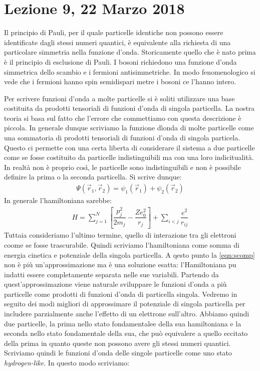 \documentclass[../AppuntiStruttura]{subfiles}
\begin{document}
	\section*{Lezione 9, 22 Marzo 2018}
		Il principio di Pauli, per il quale particelle identiche non possono essere identificate dagli stessi numeri quantici, è equivalente alla richiesta di una particolare simmetria nella funzione d'onda. Storicamente quello che è nato prima è il principio di esclusione di Pauli. I bosoni richiedono una funzione d'onda simmetrica dello scambio e i fermioni antisimmetriche. In modo fenomenologico si vede che i fermioni hanno spin semidispari metre i bosoni ce l'hanno intero.
		
		Per scrivere funzioni d'onda a molte particelle si è soliti utilizzare una base costituita da prodotti tensoriali di funzioni d'onda di singola particella. La nostra teoria si basa sul fatto che l'errore che commettiamo con questa descrizione è piccola. In generale dunque scriviamo la funzione dìonda di molte particelle come una sommatoria di prodotti tensoriali di funzioni d'onda di singola particela. Questo ci permette con una certa liberta di considerare il sistema a due particelle come se fosse costituito da particelle indistinguibili ma con una loro indicitualità. In realtà non è proprio così, le particelle sono indistinguibili e non è possibile definire la prima o la seconda particella. Si scrive dunque:
		\begin{gather}
		\label{eqn:scomp}
		\Psi(\vec{r}_{1},\vec{r}_{2})=\psi_{1}(\vec{r}_{1})+\psi_{2}(\vec{r}_{2})		
		\end{gather}
		In generale l'hamiltoniana sarebbe:
		\begin{gather}
		H=\sum_{j=1}^{N}\left[\dfrac{p_{j}^{2}}{2m_{j}}-\dfrac{Ze_{0}^{2}}{r_{j}}\right] +\sum_{i<j}\dfrac{e^{2}}{r_{ij}}
		\end{gather}
		Tuttaia consideriamo l'ultimo termine, quello di interazione tra gli elettroni coome se fosse trascurabile. Quindi scriviamo l'hamiltoniana come somma di energia cinetica e potenziale della singola particella. A qesto punto la \ref{eqn:scomp} non è più un'approssimazione ma è una soluzione esatta: l'Hamiltoniana pu indatti essere completamente separata nelle sue variabili. Partendo da quest'approssimazione viene naturale sviluppare le funzioni d'onda a più particelle come prodotti di funzioni d'onda di particella singola. Vedremo in seguito dei modi migliori di approssimare il potenziale di singola particella per includere parzialmente anche l'effetto di un elettrone sull'altro. Abbiamo quindi due particelle, la prima nello stato fondamentalee della sua hamiltoniana e la seconda nello stato fondamentale della sua, che può equivalere a quello eccitato della prima in quanto queste non possono avere gli stessi numeri quantici. Scriviamo quindi le funzioni d'onda delle singole particelle come uno stato \emph{hydrogen-like}. In questo modo scriviamo:
\end{document}
